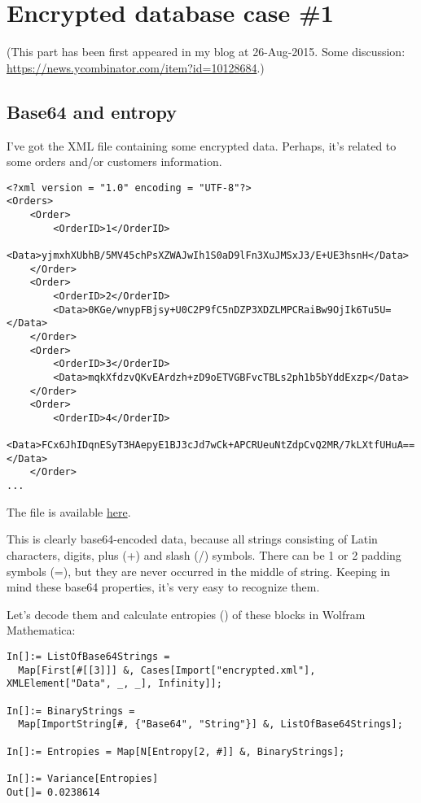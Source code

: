 \section{Encrypted database case \#1}
\label{encrypted_DB1}

(This part has been first appeared in my blog at 26-Aug-2015.
Some discussion: \url{https://news.ycombinator.com/item?id=10128684}.)

\subsection{Base64 and entropy}

I've got the XML file containing some encrypted data.
Perhaps, it's related to some orders and/or customers information.

\begin{lstlisting}
<?xml version = "1.0" encoding = "UTF-8"?>
<Orders>
	<Order>
		<OrderID>1</OrderID>
		<Data>yjmxhXUbhB/5MV45chPsXZWAJwIh1S0aD9lFn3XuJMSxJ3/E+UE3hsnH</Data>
	</Order>
	<Order>
		<OrderID>2</OrderID>
		<Data>0KGe/wnypFBjsy+U0C2P9fC5nDZP3XDZLMPCRaiBw9OjIk6Tu5U=</Data>
	</Order>
	<Order>
		<OrderID>3</OrderID>
		<Data>mqkXfdzvQKvEArdzh+zD9oETVGBFvcTBLs2ph1b5bYddExzp</Data>
	</Order>
	<Order>
		<OrderID>4</OrderID>
		<Data>FCx6JhIDqnESyT3HAepyE1BJ3cJd7wCk+APCRUeuNtZdpCvQ2MR/7kLXtfUHuA==</Data>
	</Order>
...
\end{lstlisting}

The file is available \href{https://raw.githubusercontent.com/dennis714/yurichev.com/master/blog/encrypted_DB_case_1/encrypted.xml}{here}.

This is clearly base64-encoded data, because all strings consisting of Latin characters, digits,
plus (+) and slash (/) symbols.
There can be 1 or 2 padding symbols (=), but they are never occurred in the middle of string.
Keeping in mind these base64 properties, it's very easy to recognize them.

Let's decode them and calculate entropies () of these blocks in Wolfram Mathematica:

\begin{lstlisting}
In[]:= ListOfBase64Strings = 
  Map[First[#[[3]]] &, Cases[Import["encrypted.xml"], XMLElement["Data", _, _], Infinity]];

In[]:= BinaryStrings = 
  Map[ImportString[#, {"Base64", "String"}] &, ListOfBase64Strings];

In[]:= Entropies = Map[N[Entropy[2, #]] &, BinaryStrings];

In[]:= Variance[Entropies]
Out[]= 0.0238614
\end{lstlisting}


